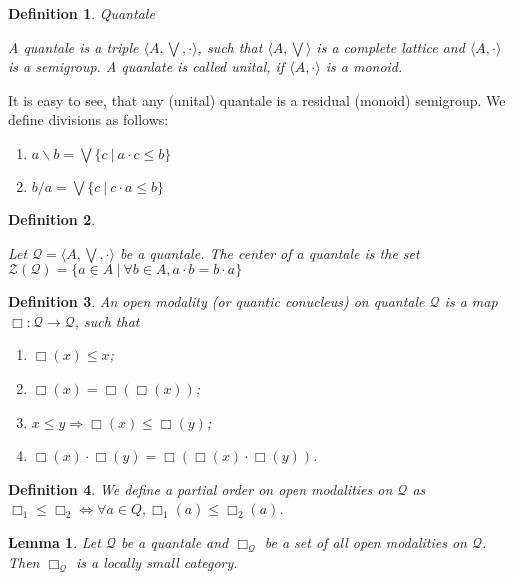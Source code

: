 \documentclass[a4paper]{article}
\newtheorem{lemma}{Lemma}
\newtheorem{defin}{Definition}
\begin{document}
\begin{defin} Quantale
$ $

  A quantale is a triple $\langle A, \bigvee, \cdot \rangle$, such that $\langle A, \bigvee \rangle$
is a complete lattice and $\langle A, \cdot \rangle$ is a semigroup. A quanlate is called unital, if $\langle A, \cdot \rangle$
is a monoid.
\end{defin}

It is easy to see, that any (unital) quantale is a residual (monoid) semigroup. We define divisions as follows:

\begin{enumerate}
\item $a \backslash b = \bigvee \{ c \: | \: a \cdot c \leq b \}$
\item $b / a = \bigvee \{ c \: | \: c \cdot a \leq b \}$
\end{enumerate}

\begin{defin}
$ $

  Let $\mathcal{Q} = \langle A, \bigvee, \cdot \rangle$ be a quantale. The center of a quantale is the set $\mathcal{Z}(\mathcal{Q}) = \{ a \in A \: | \: \forall b \in A, a \cdot b = b \cdot a \}$
\end{defin}

\begin{defin} An open modality (or quantic conucleus) on quantale $\mathcal{Q}$ is a map $\Box : \mathcal{Q} \to \mathcal{Q}$, such that

\begin{enumerate}
  \item $\Box (x) \leq x$;
  \item $\Box (x) = \Box(\Box(x))$;
  \item $x \leq y \Rightarrow \Box (x) \leq \Box (y)$;
  \item $\Box (x) \cdot \Box (y) = \Box (\Box (x) \cdot \Box (y))$.
\end{enumerate}
\end{defin}

\begin{defin}
  We define a partial order on open modalities on $\mathcal{Q}$ as $\Box_1 \leq \Box_2 \Leftrightarrow \forall a \in Q, \Box_1 (a) \leq \Box_2 (a)$.
\end{defin}

\begin{lemma}
  Let $\mathcal{Q}$ be a quantale and $\Box_{\mathcal{Q}}$ be a set of all open modalities on $\mathcal{Q}$. Then $\Box_{\mathcal{Q}}$ is a locally small category.
\end{lemma}
\end{document}
